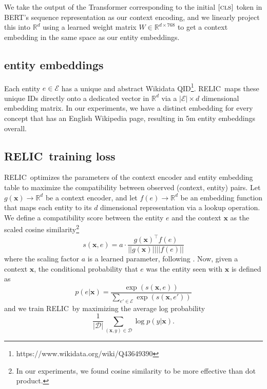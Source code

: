 \documentclass{article} \usepackage{iclr2020_conference,times}
\newcommand{\clstoken}{\textsc{[cls]}}
\newcommand{\ctx}{\mathbf{x}}
\newcommand{\ack}{RELIC\xspace}
\newcommand{\context}{g}
\newcommand{\concept}{f}
\begin{document}
We take the output of the Transformer corresponding to the initial $\clstoken$ token in BERT's sequence representation as our context encoding, and we linearly project this into $\mathbb{R}^d$ using a learned weight matrix $W\in \mathbb{R}^{d \times 768}$ to get a context embedding in the same space as our entity embeddings.

\subsection{entity embeddings}
Each entity $e \in \mathcal{E}$ has a unique and abstract Wikidata QID\footnote{https://www.wikidata.org/wiki/Q43649390}.
\ack~maps these unique IDs directly onto a dedicated vector in $\mathbb{R}^d$ via a $\mathcal{|\mathcal{E}|} \times d$ dimensional embedding matrix.
In our experiments, we have a distinct embedding for every concept that has an English Wikipedia page, resulting in 5m entity embeddings overall.

\subsection{\ack~training loss}
\label{sec:ent-ctx-compat}
\ack~optimizes the parameters of the context encoder and entity embedding table to maximize the compatibility between observed (context, entity) pairs. 
Let $\context(\mathbf{x}) \rightarrow \mathbb{R}^d$ be a context encoder, and let $\concept(e) \rightarrow \mathbb{R}^d$ be an embedding function that maps each entity to its $d$ dimensional representation via a lookup operation.
We define a compatibility score between the entity $e$ and the context $\ctx$ as the scaled cosine similarity\footnote{In our experiments, we found cosine similarity to be more effective than dot product.}
\begin{equation}
\label{eqn:entity_score}
      s(\ctx, e) = a \cdot \frac{\context(\ctx)^{\top} \concept(e)}{||\context(\ctx)||||\concept(e)||}
\end{equation}
where the scaling factor $a$ is a learned parameter, following \citet{wang2018additive}.
Now, given a context $\ctx$, the conditional probability that $e$ was the entity seen with $\ctx$ is defined as
\begin{equation}
\label{eqn:entity-prob}
  p(e | \ctx) = \frac{\exp (s(\ctx, e))}{\sum_{e' \in \mathcal{E}} \exp (s(\ctx, e'))}
\end{equation}
and we train \ack~by maximizing the average log probability 
\begin{equation}
    \frac{1}{|\mathcal{D}|} \sum_{(\ctx, y) \in \mathcal{D}} \log p(y| \ctx).
\end{equation}
\end{document}
